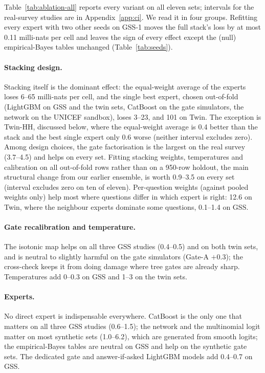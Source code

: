 Table~\ref{tab:ablation-all} reports every variant on all eleven sets; intervals for the real-survey studies are in Appendix~\ref{app:ci}. We read it in four groups. Refitting every expert with two other seeds on GSS-1 moves the full stack's loss by at most 0.11 milli-nats per cell and leaves the sign of every effect except the (null) empirical-Bayes tables unchanged (Table~\ref{tab:seeds}).

\paragraph{Stacking design.} Stacking itself is the dominant effect: the equal-weight average of the experts loses 6--65 milli-nats per cell, and the single best expert, chosen out-of-fold (LightGBM on GSS and the twin sets, CatBoost on the gate simulators, the network on the UNICEF sandbox), loses 3--23, and 101 on Twin. The exception is Twin-HH, discussed below, where the equal-weight average is 0.4 better than the stack and the best single expert only 0.6 worse (neither interval excludes zero). Among design choices, the gate factorisation is the largest on the real survey (3.7--4.5) and helps on every set. Fitting stacking weights, temperatures and calibration on all out-of-fold rows rather than on a 950-row holdout, the main structural change from our earlier ensemble, is worth 0.9--3.5 on every set (interval excludes zero on ten of eleven). Per-question weights (against pooled weights only) help most where questions differ in which expert is right: 12.6 on Twin, where the neighbour experts dominate some questions, 0.1--1.4 on GSS.

\paragraph{Gate recalibration and temperature.} The isotonic map helps on all three GSS studies (0.4--0.5) and on both twin sets, and is neutral to slightly harmful on the gate simulators (Gate-A $+0.3$); the cross-check keeps it from doing damage where tree gates are already sharp. Temperatures add 0--0.3 on GSS and 1--3 on the twin sets.

\paragraph{Experts.} No direct expert is indispensable everywhere. CatBoost is the only one that matters on all three GSS studies (0.6--1.5); the network and the multinomial logit matter on most synthetic sets (1.0--6.2), which are generated from smooth logits; the empirical-Bayes tables are neutral on GSS and help on the synthetic gate sets. The dedicated gate and answer-if-asked LightGBM models add 0.4--0.7 on GSS.

